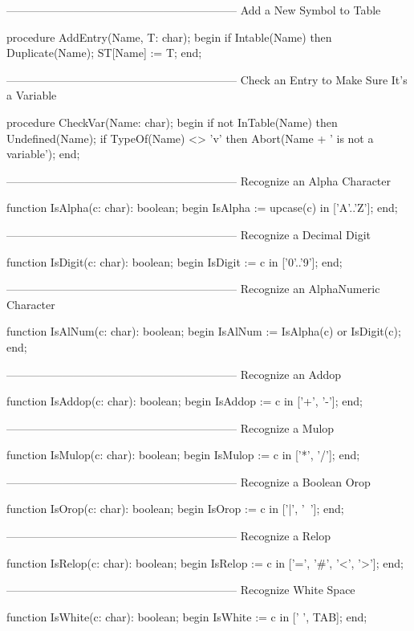 \documentclass[float=false, crop=false]{standalone}
\begin{document}
\begin{code}
{--------------------------------------------------------------}
{ Add a New Symbol to Table }

procedure AddEntry(Name, T: char);
begin
     if Intable(Name) then Duplicate(Name);
     ST[Name] := T;
end;


{--------------------------------------------------------------}
{ Check an Entry to Make Sure It's a Variable }

procedure CheckVar(Name: char);
begin
     if not InTable(Name) then Undefined(Name);
     if  TypeOf(Name)  <>  'v'  then    Abort(Name  +  ' is not a
variable');
end;


{--------------------------------------------------------------}
{ Recognize an Alpha Character }

function IsAlpha(c: char): boolean;
begin
   IsAlpha := upcase(c) in ['A'..'Z'];
end;


{--------------------------------------------------------------}
{ Recognize a Decimal Digit }

function IsDigit(c: char): boolean;
begin
   IsDigit := c in ['0'..'9'];
end;


{--------------------------------------------------------------}
{ Recognize an AlphaNumeric Character }

function IsAlNum(c: char): boolean;
begin
   IsAlNum := IsAlpha(c) or IsDigit(c);
end;


{--------------------------------------------------------------}
{ Recognize an Addop }

function IsAddop(c: char): boolean;
begin
   IsAddop := c in ['+', '-'];
end;


{--------------------------------------------------------------}
{ Recognize a Mulop }

function IsMulop(c: char): boolean;
begin
   IsMulop := c in ['*', '/'];
end;


{--------------------------------------------------------------}
{ Recognize a Boolean Orop }

function IsOrop(c: char): boolean;
begin
   IsOrop := c in ['|', '~'];
end;


{--------------------------------------------------------------}
{ Recognize a Relop }

function IsRelop(c: char): boolean;
begin
   IsRelop := c in ['=', '#', '<', '>'];
end;


{--------------------------------------------------------------}
{ Recognize White Space }

function IsWhite(c: char): boolean;
begin
   IsWhite := c in [' ', TAB];
end;



\end{code}
\end{document}
